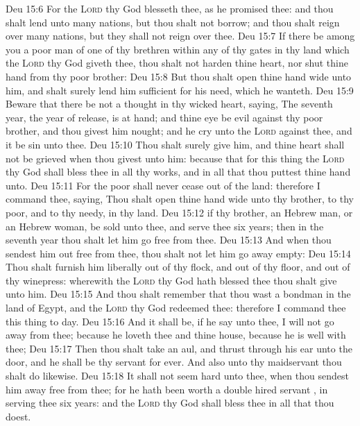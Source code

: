 \vs Deu 15:6 For the \textsc{Lord} thy God blesseth thee, as he promised thee: and thou shalt lend unto many nations, but thou shalt not borrow; and thou shalt reign over many nations, but they shall not reign over thee.
\vs Deu 15:7 If there be among you a poor man of one of thy brethren within any of thy gates in thy land which the \textsc{Lord} thy God giveth thee, thou shalt not harden thine heart, nor shut thine hand from thy poor brother:
\vs Deu 15:8 But thou shalt open thine hand wide unto him, and shalt surely lend him sufficient for his need,  which he wanteth.
\vs Deu 15:9 Beware that there be not a thought in thy wicked heart, saying, The seventh year, the year of release, is at hand; and thine eye be evil against thy poor brother, and thou givest him nought; and he cry unto the \textsc{Lord} against thee, and it be sin unto thee.
\vs Deu 15:10 Thou shalt surely give him, and thine heart shall not be grieved when thou givest unto him: because that for this thing the \textsc{Lord} thy God shall bless thee in all thy works, and in all that thou puttest thine hand unto.
\vs Deu 15:11 For the poor shall never cease out of the land: therefore I command thee, saying, Thou shalt open thine hand wide unto thy brother, to thy poor, and to thy needy, in thy land.
\vs Deu 15:12  if thy brother, an Hebrew man, or an Hebrew woman, be sold unto thee, and serve thee six years; then in the seventh year thou shalt let him go free from thee.
\vs Deu 15:13 And when thou sendest him out free from thee, thou shalt not let him go away empty:
\vs Deu 15:14 Thou shalt furnish him liberally out of thy flock, and out of thy floor, and out of thy winepress:  wherewith the \textsc{Lord} thy God hath blessed thee thou shalt give unto him.
\vs Deu 15:15 And thou shalt remember that thou wast a bondman in the land of Egypt, and the \textsc{Lord} thy God redeemed thee: therefore I command thee this thing to day.
\vs Deu 15:16 And it shall be, if he say unto thee, I will not go away from thee; because he loveth thee and thine house, because he is well with thee;
\vs Deu 15:17 Then thou shalt take an aul, and thrust  through his ear unto the door, and he shall be thy servant for ever. And also unto thy maidservant thou shalt do likewise.
\vs Deu 15:18 It shall not seem hard unto thee, when thou sendest him away free from thee; for he hath been worth a double hired servant , in serving thee six years: and the \textsc{Lord} thy God shall bless thee in all that thou doest.
